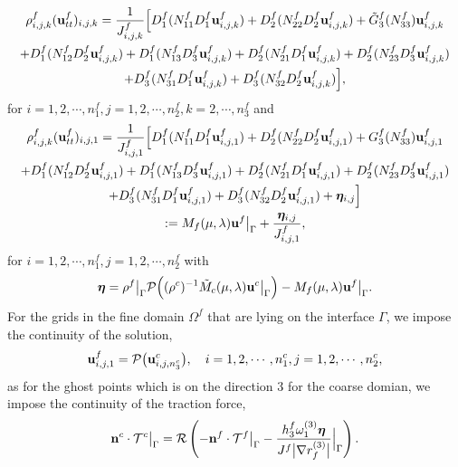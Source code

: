 \documentclass[a4paper]{article}
\begin{document}
\begin{multline}\label{fine_scheme_2}
\rho_{i,j,k}^f ({\bf u}_{tt}^f)_{i,j,k} =
 \frac{1}{J_{i,j,k}^f}\Big[D_1^f(N_{11}^fD_1^f{\bf u}_{i,j,k}^f)+D_2^f(N_{22}^fD_2^f{\bf u}_{i,j,k}^f)+\tilde{G}_3^f(N_{33}^f){\bf u}_{i,j,k}^f\\
+D_1^f(N_{12}^fD_2^f{\bf u}_{i,j,k}^f)+D_1^f(N_{13}^fD_3^f{\bf u}_{i,j,k}^f)
+D_2^f(N_{21}^fD_1^f{\bf u}_{i,j,k}^f)+D_2^f(N_{23}^fD_3^f{\bf u}_{i,j,k}^f)\\
+D_3^f(N_{31}^fD_1^f{\bf u}_{i,j,k}^f)
+D_3^f(N_{32}^fD_2^f{\bf u}_{i,j,k}^f)\Big],
\end{multline}
for $ i = 1,2,\cdots,n_1^f, j = 1,2,\cdots,n_2^f, k = 2,\cdots,n_3^f$ and
\begin{multline}\label{fine_scheme_1}
\rho_{i,j,k}^f ({\bf u}_{tt}^f)_{i,j,1} = \frac{1}{J_{i,j,1}^f}\Big[D_1^f(N_{11}^fD_1^f{\bf u}_{i,j,1}^f)+D_2^f(N_{22}^fD_2^f{\bf u}_{i,j,1}^f)+G_3^f(N_{33}^f){\bf u}_{i,j,1}^f\\
+D_1^f(N_{12}^fD_2^f{\bf u}_{i,j,1}^f)+D_1^f(N_{13}^fD_3^f{\bf u}_{i,j,1}^f)+D_2^f(N_{21}^fD_1^f{\bf u}_{i,j,1}^f)+D_2^f(N_{23}^fD_3^f{\bf u}_{i,j,1}^f)\\
+D_3^f(N_{31}^fD_1^f{\bf u}_{i,j,1}^f)+D_3^f(N_{32}^fD_2^f{\bf u}_{i,j,1}^f)+{\bm \eta}_{i,j}\Big]\\
 := M_f(\mu,\lambda){\bf u}^f\big|_\Gamma+\frac{{\bm \eta}_{i,j}}{J^f_{i,j,1}},
\end{multline}
for $ i = 1,2,\cdots,n_1^f, j = 1,2,\cdots,n_2^f$ with
\begin{equation*}
{\bm \eta} = \rho^f\big|_\Gamma\mathcal{P}\Big((\rho^c)^{-1}\tilde{M}_c(\mu,\lambda){\bf u}^c\big|_\Gamma\Big)-M_f(\mu,\lambda){\bf u}^f\big|_\Gamma.
\end{equation*}
For the grids in the fine domain $\Omega^f$  that are lying on the interface $\Gamma$, we impose the continuity of the solution,
\begin{equation*}
{\bf u}_{i,j,1}^f = \mathcal{P}\big({\bf u}_{i,j,n_3^c}^c\big), \ \ \ i = 1,2,\cdots,n_1^c, j = 1,2,\cdots,n_2^c,
\end{equation*}
as for the ghost points which is on the direction 3 for the coarse domian, we impose the continuity of the traction force,
\begin{equation*}
{\bf n}^c\cdot\mathcal{T}^c \big|_\Gamma = \mathcal{R}\left(-{\bf n}^f\cdot\mathcal{T}^f\big|_\Gamma - \frac{h_3^f\omega_1^{(3)}{\bm \eta}}{J^f\big|\nabla r_f^{(3)}\big|}\Big|_\Gamma\right).
\end{equation*}
\end{document}
